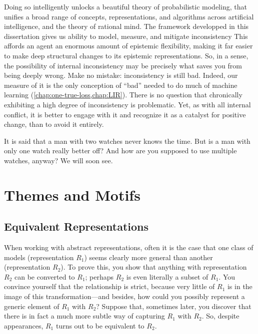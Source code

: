 Doing so intelligently unlocks a beautiful theory of probabilistic modeling, that unifies a broad range of concepts, representations, and algorithms across artificial intelligence, and the theory of rational mind. 
The framework developped in this dissertation
gives us
ability to model, measure, and mitigate inconsistency 
This affords an agent an enormous amount of epistemic flexibility,
    making it far easier to make deep structural changes to its epistemic
    representations.
So, in a sense, the possibility of internal inconsistency may be precisely what saves you from being deeply wrong. 
%
Make no mistake: inconsistency is still bad.
Indeed, our measure of it is the only conception of ``bad'' needed to do much of machine learning (\cref{chap:one-true-loss,chap:LIR}).
There is no question that chronically exhibiting a high degree of inconsistency is problematic.
%
Yet, as with all internal conflict, it is better to engage with it and recognize it as a catalyst for positive change, 
than to avoid it entirely. 

%
It is said that a man with two watches never knows the time.  
But is a man with only one watch really better off?
And how are you supposed to use multiple watches, anyway?
We will soon see. 


\section{Themes and Motifs}
%
\subsection{Equivalent Representations}

When working with abstract representations, often it is the case that one class of models (representation $R_1$) seems clearly more general than another (representation $R_2$).
To prove this, you show that anything with representation $R_2$ can be converted to $R_1$; perhaps $R_2$ is even literally a subset of $R_1$. 
You convince yourself that the relationship is strict, because very little of $R_1$ is in the image of this transformation---and besides, how could you possibly represent a generic element of $R_1$ with $R_2$? 
Suppose that, sometimes later,
 you discover that there is in fact a much more subtle way of capturing $R_1$ with $R_2$. 
So, despite appearances, $R_1$ turns out to be equivalent to $R_2$. 

